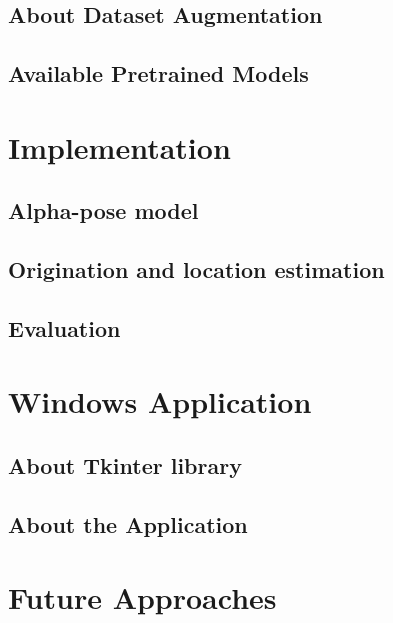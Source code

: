 \documentclass{article}
\begin{document}
\subsection{About Dataset Augmentation}
\subsection{Available Pretrained Models}
\section{Implementation}
\subsection{Alpha-pose model}
\subsection{Origination and location estimation}
\subsection{Evaluation}
\section{Windows Application}
\subsection{About Tkinter library}
\subsection{About the Application }
\section{Future Approaches}
\end{document}
